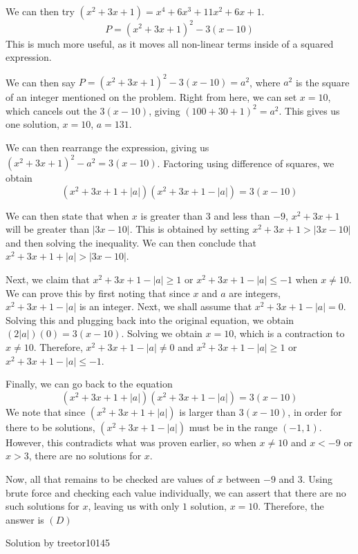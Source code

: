 \begin{enumerate}
 We can then try $(x^2+3x+1)=x^4+6x^3+11x^2+6x+1$. 
 \[P=(x^2+3x+1)^2-3(x-10)\]This is much more useful, as it moves all non-linear terms inside of a squared expression.

 We can then say $P=(x^2+3x+1)^2-3(x-10)=a^2$, where $a^2$ is the square of an integer mentioned on the problem. Right from here, we can set $x=10$, which cancels out the $3(x-10)$, giving $(100+30+1)^2=a^2$. This gives us one solution, $x=10$, $a=131$.

 
We can then rearrange the expression, giving us $(x^2+3x+1)^2-a^2=3(x-10)$. Factoring using difference of squares, we obtain 
 \[(x^2+3x+1+|a|)(x^2+3x+1-|a|)=3(x-10)\]

 We can then state that when $x$ is greater than $3$ and less than $-9$, $x^2+3x+1$ will be greater than $|3x-10|$. This is obtained by setting $x^2+3x+1>|3x-10|$ and then solving the inequality. We can then conclude that $x^2+3x+1+|a|>|3x-10|$. 

 Next, we claim that $x^2+3x+1-|a| \geq 1$ or $x^2+3x+1-|a| \leq -1$ when $x \neq 10$. We can prove this by first noting that since $x$ and $a$ are integers, $x^2+3x+1-|a|$ is an integer. Next, we shall assume that $x^2+3x+1-|a|=0$. Solving this and plugging back into the original equation, we obtain $(2|a|)(0)=3(x-10)$. Solving we obtain $x=10$, which is a contraction to $x \neq 10$. Therefore, $x^2+3x+1-|a| \neq 0$ and $x^2+3x+1-|a| \geq 1$ or $x^2+3x+1-|a| \leq -1$.

 Finally, we can go back to the equation 
 \[(x^2+3x+1+|a|)(x^2+3x+1-|a|)=3(x-10)\]We note that since $(x^2+3x+1+|a|)$ is larger than $3(x-10)$, in order for there to be solutions, $(x^2+3x+1-|a|)$ must be in the range $(-1,1)$. However, this contradicts what was proven earlier, so when $x \neq 10$ and $x < -9$ or $x > 3$, there are no solutions for $x$. 

 
Now, all that remains to be checked are values of $x$ between $-9$ and $3$. Using brute force and checking each value individually, we can assert that there are no such solutions for $x$, leaving us with only $1$ solution, $x=10$. Therefore, the answer is $\boxed{(D) }$

 Solution by treetor10145

 


\end{enumerate}
